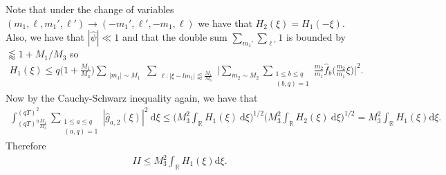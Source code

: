 \documentclass[12pt]{amsart}
\theoremstyle{definition}
\theoremstyle{plain}
\theoremstyle{remark}
\numberwithin{equation}{section}
\numberwithin{theorem}{section}
\numberwithin{equation}{section}
\begin{document}
	Note that under the change of variables $(m_1,\ell,m_1',\ell') \to (-m_1',\ell',-m_1,\ell)$ we have that $H_2(\xi)=H_1(-\xi)$. Also, we have that $|\hat{\psi}| \ll 1$ and that the double sum $\sum_{m_1'}\sum_{\ell'} 1$ is bounded by $\lessapprox 1+M_1/M_3$ so 
	\begin{align*}
		H_1(\xi) \leq q\bigg(1+ \frac{M_1}{M_3}\bigg)\sum_{\substack{|m_1|\sim M_1}} \sum_{\substack{\ell : |\xi-lm_1| \lessapprox \frac{M_1}{M_3} \\ }} \bigg|\sum_{m_2 \sim M_2}\sum_{\substack{1 \leq b \leq q \\ (b,q)=1}} \frac{m_2}{m_1} \hat{f}_b \bigg(\frac{m_2}{m_1}\xi\bigg)\bigg|^2.
	\end{align*}
	Now by the Cauchy-Schwarz inequality again, we have that 
	\begin{align*}
		\int_{(qT)^{\eta}\frac{M_{1}}{M_{3}}}^{(qT)^{2}}\sum_{\substack{1 \leq a \leq q \\ (a, q)=1}}|\hat{g}_{a,2}(\xi)|^{2}\: \mathrm{d} \xi\leq \bigg(M_{3}^{2}\int_{\mathbb{R}}H_{1}(\xi)\: \mathrm{d} \xi\bigg)^{1/2}\bigg(M_{3}^{2}\int_{\mathbb{R}}H_{2}(\xi)\: \mathrm{d} \xi\bigg)^{1/2} = M_3^2 \int_{\mathbb{R}}H_1(\xi) \mathrm{d} \xi.
	\end{align*}
	Therefore 
	\begin{align}\label{causII}
		II \leq M_3^2 \int_{\mathbb{R}} H_1(\xi) \mathrm{d}\xi.
	\end{align}
	
\end{document}
